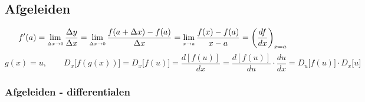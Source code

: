 \documentclass[a5paper]{article}
\begin{document}
\newpage

\subsection{Afgeleiden}
\fontsize{13pt}{14pt}\selectfont
\[f'(a)
= \lim_{\scriptscriptstyle \Delta x \to 0} \frac{\Delta y}{\Delta x}
= \lim_{\scriptscriptstyle \Delta x \to 0} \frac{f(a + \Delta x) - f(a)}{\Delta x}
= \lim_{\scriptscriptstyle x \to a} \frac{f(x) - f(a)}{x - a}
= \left( \frac{df}{dx} \right)_{x=a}
\\
\]
\normalsize
\[g(x) = u, \qquad D_x\!\bigl[f(g(x))\bigr]
= D_x\!\bigl[f(u)\bigr]
= \frac{d[f(u)]}{dx}
= \frac{d[f(u)]}{du} \cdot \frac{du}{dx}
= D_u\!\bigl[f(u)\bigr] \cdot D_x\!\bigl[u\bigr]\]
\subsubsection{Afgeleiden - differentialen}
\fontsize{14pt}{15pt}\selectfont
\end{document}
